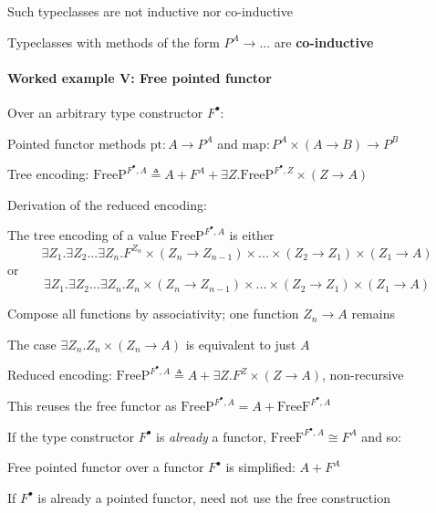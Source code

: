 Such typeclasses are not inductive nor co-inductive

Typeclasses with methods of the form $P^{A}\rightarrow...$ are \textbf{co-inductive}


\paragraph{Worked example V: Free pointed functor}

Over an arbitrary type constructor $F^{\bullet}$:

Pointed functor methods {\footnotesize{}$\text{pt}:A\rightarrow P^{A}$}
and {\footnotesize{}$\text{map}:P^{A}\times\left(A\rightarrow B\right)\rightarrow P^{B}$}{\footnotesize\par}

Tree encoding: {\footnotesize{}$\text{FreeP}^{F^{\bullet},A}\triangleq A+F^{A}+\exists Z.\text{FreeP}^{F^{\bullet},Z}\times\left(Z\rightarrow A\right)$}{\footnotesize\par}

Derivation of the reduced encoding:

The tree encoding of a value $\text{FreeP}^{F^{\bullet},A}$ is either{\footnotesize{}
\[
\exists Z_{1}.\exists Z_{2}...\exists Z_{n}.F^{Z_{n}}\times\left(Z_{n}\rightarrow Z_{n-1}\right)\times...\times\left(Z_{2}\rightarrow Z_{1}\right)\times\left(Z_{1}\rightarrow A\right)
\]
}or{\footnotesize{}
\[
\exists Z_{1}.\exists Z_{2}...\exists Z_{n}.Z_{n}\times\left(Z_{n}\rightarrow Z_{n-1}\right)\times...\times\left(Z_{2}\rightarrow Z_{1}\right)\times\left(Z_{1}\rightarrow A\right)
\]
}{\footnotesize\par}

Compose all functions by associativity; one function $Z_{n}\rightarrow A$
remains

The case $\exists Z_{n}.Z_{n}\times\left(Z_{n}\rightarrow A\right)$
is equivalent to just $A$

Reduced encoding: {\footnotesize{}$\text{FreeP}^{F^{\bullet},A}\triangleq A+\exists Z.F^{Z}\times\left(Z\rightarrow A\right)$,
}non-recursive

This reuses the free functor as $\text{FreeP}^{F^{\bullet},A}=A+\text{FreeF}^{F^{\bullet},A}$

If the type constructor $F^{\bullet}$ is \emph{already} a functor,
$\text{FreeF}^{F^{\bullet},A}\cong F^{A}$ and so:

Free pointed functor over a functor $F^{\bullet}$ is simplified:
$A+F^{A}$

If $F^{\bullet}$ is already a pointed functor, need not use the free
construction

